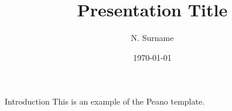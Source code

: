 \documentclass{beamer}
\title{Presentation Title}
\author{N. Surname}
\institute{Politecnico di Torino}
\date{\today}
\begin{document}
\begin{frame}
  \titlepage
\end{frame}

\begin{frame}{Introduction}
  This is an example of the Peano template.
\end{frame}
\end{document}
